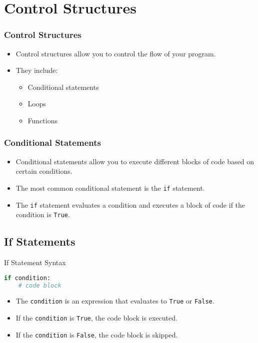 
\section{Control Structures}
\begin{frame}
    \frametitle{Control Structures}
    \begin{itemize}
        \item Control structures allow you to control the flow of your program.
        \item They include:
        \begin{itemize}
            \item Conditional statements
            \item Loops
            \item Functions
        \end{itemize}
    \end{itemize}
\end{frame}
\begin{frame}
    \frametitle{Conditional Statements}
    \begin{itemize}
        \item Conditional statements allow you to execute different blocks of code based on certain conditions.
        \item The most common conditional statement is the \texttt{if} statement.
        \item The \texttt{if} statement evaluates a condition and executes a block of code if the condition is \texttt{True}.
    \end{itemize}
\end{frame}
\subsection{If Statements}
\begin{frame}[fragile]{If Statement Syntax}
    \begin{lstlisting}[style=colorful, language=Python]
if condition:
    # code block
    \end{lstlisting}
    \begin{itemize}
        \item The \texttt{condition} is an expression that evaluates to \texttt{True} or \texttt{False}.
        \item If the \texttt{condition} is \texttt{True}, the code block is executed.
        \item If the \texttt{condition} is \texttt{False}, the code block is skipped.
    \end{itemize}
\end{frame}

